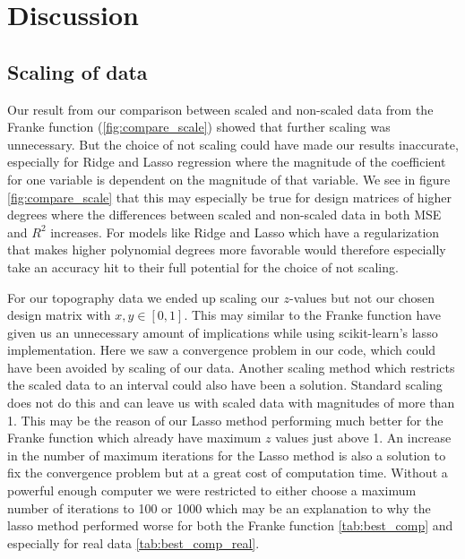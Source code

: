\documentclass[12pt]{article}
\begin{document}
\section{Discussion}
\subsection{Scaling of data}
Our result from our comparison between scaled and non-scaled data from the Franke function (\ref{fig:compare_scale}) showed that further scaling was unnecessary. But the choice of not scaling could have made our results inaccurate, especially for Ridge and Lasso regression where the magnitude of the coefficient for one variable is dependent on the magnitude of that variable. We see in figure \ref{fig:compare_scale} that this may especially be true for design matrices of higher degrees where the differences between scaled and non-scaled data in both MSE and $R^2$ increases. For models like Ridge and Lasso which have a regularization that makes higher polynomial degrees more favorable would therefore especially take an accuracy hit to their full potential for the choice of not scaling.

For our topography data we ended up scaling our $z$-values but not our chosen design matrix with $x,y\in [0,1]$. This may similar to the Franke function have given us an unnecessary amount of implications while using scikit-learn's lasso implementation. Here we saw a convergence problem in our code, which could have been avoided by scaling of our data. Another scaling method which restricts the scaled data to an interval could also have been a solution. Standard scaling does not do this and can leave us with scaled data with magnitudes of more than 1. This may be the reason of our Lasso method performing much better for the Franke function which already have maximum $z$ values just above 1. An increase in the number of maximum iterations for the Lasso method is also a solution to fix the convergence problem but at a great cost of computation time. Without a powerful enough computer we were restricted to either choose a maximum number of iterations to 100 or 1000 which may be an explanation to why the lasso method performed worse for both the Franke function \ref{tab:best_comp} and especially for real data \ref{tab:best_comp_real}.
\end{document}
